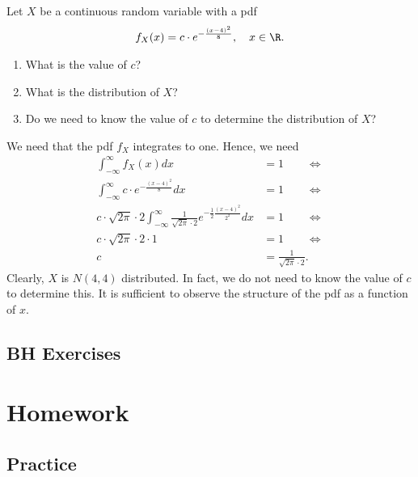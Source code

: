 \begin{exercise}
Let $X$ be a continuous random variable with a pdf
\begin{align}
    f_X(x) = c \cdot e^{-\frac{(x - 4)^2}{8}}, \quad x \in \R.
\end{align}
\begin{enumerate}
    \item What is the value of $c$?
    \item What is the distribution of $X$?
    \item Do we need to know the value of $c$ to determine the distribution of $X$?
\end{enumerate}
\begin{solution}
We need that the pdf $f_X$ integrates to one. Hence, we need
\begin{align}
    \int_{-\infty}^\infty f_X(x) dx &= 1 \qquad \iff \\
    \int_{-\infty}^\infty c \cdot e^{-\frac{(x - 4)^2}{8}} dx &= 1 \qquad \iff \\
    c \cdot \sqrt{2\pi}\cdot 2 \int_{-\infty}^\infty  \frac{1}{\sqrt{2\pi}\cdot 2} e^{-\frac{1}{2}\frac{(x - 4)^2}{2^2}} dx &= 1 \qquad \iff \\
    c \cdot \sqrt{2\pi}\cdot 2 \cdot 1 &= 1 \qquad \iff \\
    c &= \frac{1}{\sqrt{2\pi}\cdot 2}.
\end{align}
Clearly, $X$ is $N(4,4)$ distributed. In fact, we do not need to know the value of $c$ to determine this. It is sufficient to observe the structure of the pdf as a function of $x$. %
\end{solution}
\end{exercise}


\subsection{BH Exercises}

\section{Homework}

\label{sec:homework}

\subsection{Practice}
\label{sec:practice}


